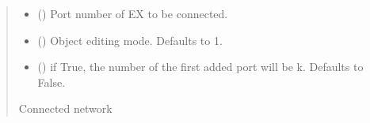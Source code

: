 \documentclass[letterpaper,10pt,english]{sphinxmanual}
\begin{document}
\begin{fulllineitems}
\begin{fulllineitems}
\begin{quote}
\begin{description}
\begin{itemize}
\item {} 
\sphinxAtStartPar
{} () \textendash{} Port number of EX to be connected.

\item {} 
\sphinxAtStartPar
{} (\sphinxstyleliteralemphasis{\sphinxupquote{, }}) \textendash{} Object editing mode. Defaults to \sphinxhyphen{}1.

\item {} 
\sphinxAtStartPar
{} (\sphinxstyleliteralemphasis{\sphinxupquote{, }}) \textendash{} if True, the number of the first added port will be k. Defaults to False.

\end{itemize}

\sphinxAtStartPar
Connected network

\sphinxAtStartPar
{\hyperref[\detokenize{touchstone:touchstone.spfile}]{}}

\end{description}\end{quote}

\end{fulllineitems}


\begin{fulllineitems}
\label{\detokenize{touchstone:touchstone.spfile.convert_s1p_to_s2p}}
\pysigstartsignatures
{}
\pysigstopsignatures
\end{fulllineitems}


\begin{fulllineitems}
\label{\detokenize{touchstone:touchstone.spfile.copy}}
\pysigstartsignatures
{}
\pysigstopsignatures
\end{fulllineitems}


\end{fulllineitems}
\end{document}
